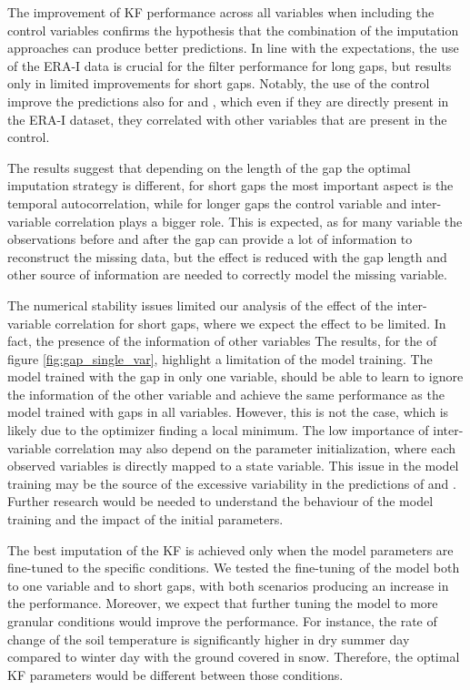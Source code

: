 \documentclass{article}
\begin{document}
The improvement of KF performance across all variables when including the control variables confirms the hypothesis that the combination of the imputation approaches can produce better predictions. In line with the expectations, the use of the ERA-I data is crucial for the filter performance for long gaps, but results only in limited improvements for short gaps. Notably, the use of the control improve the predictions also for  and , which even if they are directly present in the ERA-I dataset, they correlated with other variables that are present in the control.

The results suggest that depending on the length of the gap the optimal imputation strategy is different, for short gaps the most important aspect is the temporal autocorrelation, while for longer gaps the control variable and inter-variable correlation plays a bigger role. This is expected, as for many variable the observations before and after the gap can provide a lot of information to reconstruct the missing data, but the effect is reduced with the gap length and other source of information are needed to correctly model the missing variable.

The numerical stability issues limited our analysis of the effect of the inter-variable correlation for short gaps, where we expect the effect to be limited. In fact, the presence of the information of other variables
The results, for the of figure \ref{fig:gap_single_var}, highlight a limitation of the model training. The model trained with the gap in  only one variable, should be able to learn to ignore the information of the other variable and achieve the same performance as the model trained with gaps in all variables. However, this is not the case, which is likely due to the optimizer finding a local minimum.
The low importance of inter-variable correlation may also depend on the parameter initialization, where each observed variables is directly mapped to a state variable. This issue in the model training may be the source of the excessive variability in the predictions of   and .
Further research would be needed to understand the behaviour of the model training and the impact of the initial parameters.

The best imputation of the KF is achieved only when the model parameters are fine-tuned to the specific conditions. We tested the fine-tuning of the model both to one variable and to short gaps, with both scenarios producing an increase in the performance. Moreover, we expect that further tuning the model to more granular conditions would improve the performance. For instance, the rate of change of the soil temperature is significantly  higher in dry summer day compared to winter day with the ground covered in snow. Therefore, the optimal KF parameters would be different between those conditions.
\end{document}

